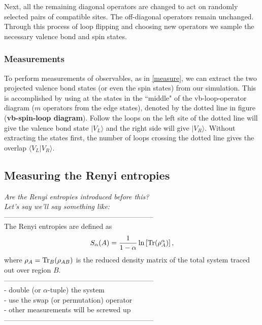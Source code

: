 \documentclass[prb,aps,twocolumn,floatfix,amsmath,amssymb,superscriptaddress,tightenlines]{revtex4}
\begin{document}
Next, all the remaining diagonal operators are changed to act on randomly selected pairs of compatible sites.
The off-diagonal operators remain unchanged.
Through this process of loop flipping and choosing new operators we sample the necessary valence bond and spin states.

\subsubsection{Measurements}

To perform measurements of observables, as in \eqref{measure}, we can extract the two projected valence bond states (or even the spin states) from our simulation.  
This  is accomplished by using at the states in the ``middle" of the vb-loop-operator diagram ($m$ operators from the edge states), denoted by the dotted line in figure ({\bf \!vb-spin-loop diagram}).
Follow the loops on the left site of the dotted line will give the valence bond state $\lvert V_L \rangle$ and the right side will give $\lvert V_R \rangle$.
Without extracting the states first, the number of loops crossing the dotted line gives the overlap $\langle V_L \lvert V_R \rangle $.

\subsection{Measuring the Renyi entropies}
{\it Are the Renyi entropies introduced before this?}\\ 
{\it Let's say we'll say something like:}\\
---------------------------------------------------------------\\
The Renyi entropies are defined as 
\begin{equation} \label{renyi}
S_{\alpha}(A) = \frac{1}{1-\alpha}\ln \left[ {\rm Tr}(\rho_A^{\alpha}) \right],
\end{equation}
where $\rho_A = {\rm Tr}_B (\rho_{AB})$ is the reduced density matrix of the total system traced out over region $B$.\\
---------------------------------------------------------------\\
\noindent
- {double (or $\alpha$-tuple) the system}\\
- {use the swap (or permutation) operator}\\
- {other measurements will be screwed up} \\
---------------------------------------------------------------\\
\end{document}
